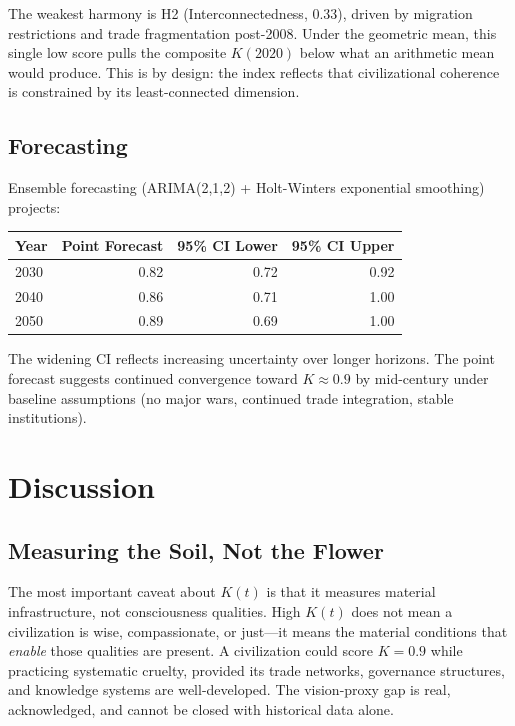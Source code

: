 \documentclass[10pt,letterpaper]{article}
\newcommand{\kt}{$K(t)$}
\begin{document}
The weakest harmony is H2 (Interconnectedness, 0.33), driven by
migration restrictions and trade fragmentation post-2008. Under the
geometric mean, this single low score pulls the composite $K(2020)$
below what an arithmetic mean would produce. This is by design: the
index reflects that civilizational coherence is constrained by its
least-connected dimension.

\subsection*{Forecasting}

Ensemble forecasting (ARIMA(2,1,2) + Holt-Winters exponential smoothing)
projects:

\begin{center}
\begin{tabular}{lrrr}
\toprule
Year & Point Forecast & 95\% CI Lower & 95\% CI Upper \\
\midrule
2030 & 0.82 & 0.72 & 0.92 \\
2040 & 0.86 & 0.71 & 1.00 \\
2050 & 0.89 & 0.69 & 1.00 \\
\bottomrule
\end{tabular}
\end{center}

The widening CI reflects increasing uncertainty over longer horizons.
The point forecast suggests continued convergence toward $K \approx 0.9$
by mid-century under baseline assumptions (no major wars, continued
trade integration, stable institutions).

\section*{Discussion}

\subsection*{Measuring the Soil, Not the Flower}

The most important caveat about \kt{} is that it measures material
infrastructure, not consciousness qualities. High \kt{} does not mean
a civilization is wise, compassionate, or just---it means the material
conditions that \emph{enable} those qualities are present. A civilization
could score $K = 0.9$ while practicing systematic cruelty, provided its
trade networks, governance structures, and knowledge systems are
well-developed. The vision-proxy gap is real, acknowledged, and cannot
be closed with historical data alone.
\end{document}
